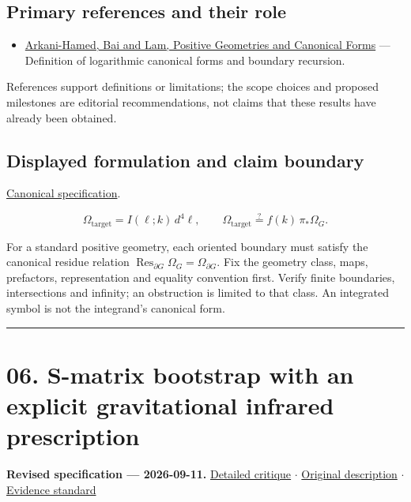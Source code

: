 \documentclass[
  11pt,
]{article}
\providecommand{\tightlist}{%
  \setlength{\itemsep}{0pt}\setlength{\parskip}{0pt}}
\begin{document}
\subsection{Primary references and their role}

\begin{itemize}
\tightlist
\item
  \href{https://arxiv.org/abs/1703.04541}{Arkani-Hamed, Bai and Lam,
  Positive Geometries and Canonical Forms} --- Definition of logarithmic
  canonical forms and boundary recursion.
\end{itemize}

References support definitions or limitations; the scope choices and
proposed milestones are editorial recommendations, not claims that these
results have already been obtained.

\subsection{Displayed formulation and claim boundary}

\href{https://github.com/rick-stevens-ai/Pure-Thought/blob/main/PRDs/05-Positive-Geometry-Gravity.md}{Canonical
specification}.

\[\Omega_{\mathrm{target}}=I(\ell;k)\,d^4\ell,
\qquad \Omega_{\mathrm{target}}\stackrel{?}{=}f(k)\,\pi_*\Omega_G.\]

For a standard positive geometry, each oriented boundary must satisfy
the canonical residue relation
\(\operatorname{Res}_{\partial G}\Omega_G=\Omega_{\partial G}\). Fix the
geometry class, maps, prefactors, representation and equality convention
first. Verify finite boundaries, intersections and infinity; an
obstruction is limited to that class. An integrated symbol is not the
integrand's canonical form.

\begin{center}\rule{0.5\linewidth}{0.5pt}\end{center}

\section{06. S-matrix bootstrap with an explicit gravitational infrared
prescription}

\textbf{Revised specification --- 2026-09-11.}
\href{https://github.com/rick-stevens-ai/Pure-Thought/blob/main/reviews/06-Nonperturbative-S-matrix-Bootstrap.md}{Detailed
critique} \ensuremath{\cdot}
\href{https://github.com/rick-stevens-ai/Pure-Thought/blob/main/archive/original-PRDs/06-Nonperturbative-S-matrix-Bootstrap.md}{Original
description} \ensuremath{\cdot}
\href{https://github.com/rick-stevens-ai/Pure-Thought/blob/main/reviews/EVIDENCE-STANDARD.md}{Evidence
standard}
\end{document}
